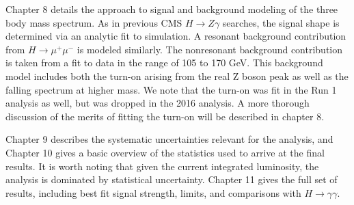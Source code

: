 Chapter 8 details the approach to signal and background modeling of the three body 
mass spectrum. As in previous CMS $H \rightarrow Z\gamma$ searches, the 
signal shape is determined via an analytic fit to simulation. A resonant background 
contribution from $H \rightarrow \mu^{+}\mu^{-}$ is modeled similarly. The nonresonant 
background contribution is taken from a fit to data in the range of 105 to 170 GeV. This 
background model includes both the turn-on arising from the real Z boson peak as well as 
the falling spectrum at higher mass. We note that the turn-on was fit in the Run 1 analysis as 
well, but was dropped in the 2016 analysis. A more thorough discussion of the merits of fitting 
the turn-on will be described in chapter 8.

Chapter 9 describes the systematic uncertainties relevant for the analysis, and Chapter 10
gives a basic overview of the statistics used to arrive at the final results. It is 
worth noting that given the current integrated luminosity, the analysis is dominated by 
statistical uncertainty. Chapter 11 gives the full set of results, including best fit 
signal strength, limits, and comparisons with $H\rightarrow \gamma\gamma$. 


